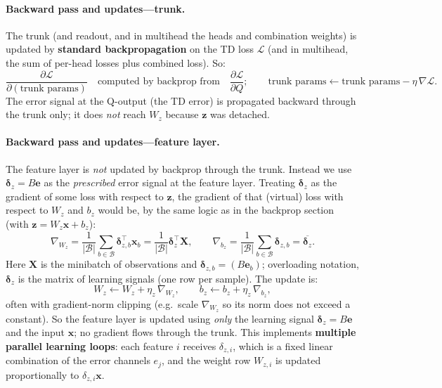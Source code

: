 \documentclass[11pt]{article}
\begin{document}
\paragraph{Backward pass and updates---trunk.} The trunk (and readout, and in multihead the heads and combination weights) is updated by \textbf{standard backpropagation} on the TD loss $\mathcal{L}$ (and in multihead, the sum of per-head losses plus combined loss). So:
\begin{equation}
\frac{\partial \mathcal{L}}{\partial (\text{trunk params})} \quad \text{computed by backprop from} \quad \frac{\partial \mathcal{L}}{\partial Q}; \qquad \text{trunk params} \leftarrow \text{trunk params} - \eta \, \nabla \mathcal{L}.
\end{equation}
The error signal at the Q-output (the TD error) is propagated backward through the trunk only; it does \emph{not} reach $W_z$ because $\mathbf{z}$ was detached.

\paragraph{Backward pass and updates---feature layer.} The feature layer is \emph{not} updated by backprop through the trunk. Instead we use $\boldsymbol{\delta}_z = B\mathbf{e}$ as the \emph{prescribed} error signal at the feature layer. Treating $\boldsymbol{\delta}_z$ as the gradient of some loss with respect to $\mathbf{z}$, the gradient of that (virtual) loss with respect to $W_z$ and $b_z$ would be, by the same logic as in the backprop section (with $\mathbf{z} = W_z \mathbf{x} + b_z$):
\begin{equation}
\nabla_{W_z} = \frac{1}{|\mathcal{B}|} \sum_{b \in \mathcal{B}} \boldsymbol{\delta}_{z,b}^{\top} \mathbf{x}_b = \frac{1}{|\mathcal{B}|} \boldsymbol{\delta}_z^{\top} \mathbf{X}, \qquad \nabla_{b_z} = \frac{1}{|\mathcal{B}|} \sum_{b \in \mathcal{B}} \boldsymbol{\delta}_{z,b} = \overline{\boldsymbol{\delta}_z}.
\end{equation}
Here $\mathbf{X}$ is the minibatch of observations and $\boldsymbol{\delta}_{z,b} = (B\mathbf{e}_b)$; overloading notation, $\boldsymbol{\delta}_z$ is the matrix of learning signals (one row per sample). The update is:
\begin{equation}
W_z \leftarrow W_z + \eta_z \, \nabla_{W_z}, \qquad b_z \leftarrow b_z + \eta_z \, \nabla_{b_z},
\end{equation}
often with gradient-norm clipping (e.g.\ scale $\nabla_{W_z}$ so its norm does not exceed a constant). So the feature layer is updated using \emph{only} the learning signal $\boldsymbol{\delta}_z = B\mathbf{e}$ and the input $\mathbf{x}$; no gradient flows through the trunk. This implements \textbf{multiple parallel learning loops}: each feature $i$ receives $\delta_{z,i}$, which is a fixed linear combination of the error channels $e_j$, and the weight row $W_{z,i}$ is updated proportionally to $\delta_{z,i} \mathbf{x}$.
\end{document}
